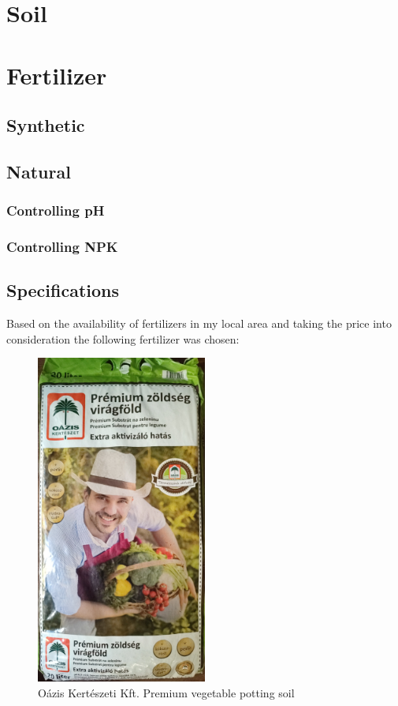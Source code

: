 \documentclass[a4paper,12pt]{article}
\begin{document}
\section{Soil}

\section{Fertilizer}
\subsection{Synthetic}
\subsection{Natural}
\subsubsection{Controlling pH}
\subsubsection{Controlling NPK}
\subsection{Specifications}
Based on the availability of fertilizers in my local area and taking the price into consideration the following fertilizer was chosen:

\begin{figure}[H]
	\centering
	\includegraphics[width=0.5\textwidth]{assets/fertilizer_front.jpg}
	\caption{Oázis Kertészeti Kft. Premium vegetable potting soil}
	\label{fig:myimage}
\end{figure}
\end{document}
